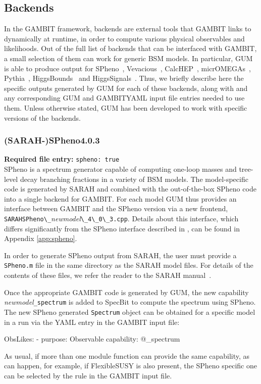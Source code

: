 \documentclass[pdftex,twocolumn,epjc3_preprint,runningheads]{svjour3}
\renewcommand{\_}{\discretionary{\underscore}{}{\underscore}}
\newcommand\cpp[1]{{\lstinline!#1!}}  %
\newcommand\term[1]{{\lstset{style=terminal}\lstinline!#1!\lstset{style=cpp}}}
\newcommand\guminline[1]{{{\lstset{style=gum}\lstinline!#1!}}}
\newcommand{\metavarf}[1]{\textit{\color{darkgreen}\footnotesize\textrm{#1}}}
\newcommand{\metavar}{\metavarf}
\newcommand{\gambit}{\textsf{GAMBIT}\xspace}
\newcommand{\specbit}{\textsf{SpecBit}\xspace}
\newcommand{\GB}{\gambit}
\newcommand{\pythia}{\textsf{Pythia}\xspace}
\newcommand{\higgsbounds}{\textsf{HiggsBounds}\xspace}
\newcommand{\higgssignals}{\textsf{HiggsSignals}\xspace}
\newcommand{\micromegas}{\textsf{micrOMEGAs}\xspace}
\newcommand\FS{\FlexibleSUSY}
\newcommand\FlexibleSUSY{\textsf{FlexibleSUSY}\xspace}
\newcommand{\gum}{\textsf{GUM}\xspace}
\newcommand{\dgum}{\!\!\term{.gum}\!\xspace}
\newcommand{\sarah}{\textsf{SARAH}\xspace}
\newcommand{\CH}{\textsf{CalcHEP}\xspace}
\newcommand{\veva}{\textsf{Vevacious}\xspace}
\newcommand{\spheno}{\textsf{SPheno}\xspace}
\newcommand\YAML{\textsf{YAML}\xspace}
\newcommand{\nm}{\metavar{new\_model}}
\begin{document}
\subsection{Backends}\label{sec:backends}

In the \gambit framework, backends are external tools that \gambit links to dynamically at runtime, in order to compute various physical observables and likelihoods. Out of the full list of backends that can be interfaced with \gambit, a small selection of them can work for generic BSM models. In particular, \gum is able to produce output for \spheno~\cite{Porod:2003um,Porod:2011nf}, \veva~\cite{Camargo-Molina:2013qva}, \CH~\cite{Belyaev:2012qa}, \micromegas~\cite{micromegas}, \pythia~\cite{Sjostrand:2014zea}, \higgsbounds~\cite{Bechtle:2008jh,Bechtle:2011sb,Bechtle:2013wla,arXiv:1507.06706} and \higgssignals~\cite{HiggsSignals,Bechtle:2014ewa}. Thus, we briefly describe here the specific outputs generated by \gum for each of these backends, along with and any corresponding \gum and \GB \YAML input file entries needed to use them. Unless otherwise stated, \gum has been developed to work with specific versions of the backends.

\subsubsection{(\sarah-)\spheno \textsf{4.0.3}}

\textbf{Required \dgum file entry:} \guminline{spheno: true}\\

\spheno is a spectrum generator capable of computing one-loop masses and tree-level decay branching fractions in a variety of BSM models. The model-specific code is generated by \sarah and combined with the out-of-the-box \spheno code into a single backend for \gambit. For each model \gum thus provides an interface between \gambit and the \spheno version via a new frontend, \term{SARAHSPheno\_}\nm\term{\_4\_0\_3.cpp}. Details about this interface, which differs significantly from the \spheno interface described in \cite{SDPBit}, can be found in Appendix \ref{app:spheno}.

In order to generate \spheno output from \sarah, the user must provide a \term{SPheno.m} file in the same directory as the \sarah model files. For details of the contents of these files, we refer the reader to the \sarah manual~\cite{Staub:2015kfa}.

Once the appropriate \gambit code is generated by \gum, the new capability \nm\cpp{_spectrum} is added to \specbit to compute the spectrum using \spheno. The new \spheno generated \cpp{Spectrum} object can be obtained for a specific model in a run via the \YAML entry in the \gambit input file:
%
\begin{lstyaml}
ObsLikes:
  - purpose: Observable
    capability: @\nm@_spectrum
\end{lstyaml}
%
As usual, if more than one module function can provide the same capability, as can happen, for example, if \FS is also present, the \spheno specific one can be selected by the rule in the \gambit input file.
\end{document}
